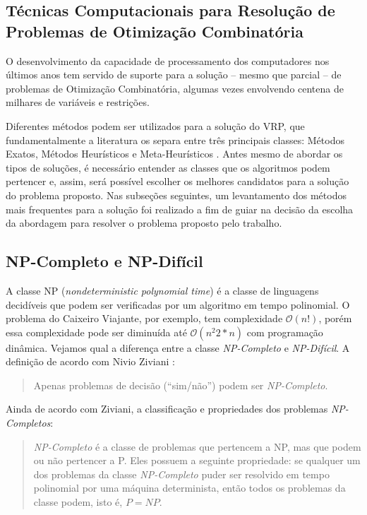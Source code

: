 \subsection{Técnicas Computacionais para Resolução de Problemas de Otimização Combinatória}
\label{tecnicas-computacionais}
O desenvolvimento da capacidade de processamento dos computadores nos últimos anos tem servido de suporte para a solução -- mesmo que parcial -- de problemas de Otimização Combinatória, algumas vezes envolvendo centena de milhares de variáveis e restrições.

Diferentes métodos podem ser utilizados para a solução do VRP, que fundamentalmente a literatura os separa entre três principais classes: Métodos Exatos, Métodos Heurísticos e Meta-Heurísticos \cite{maxwell}. Antes mesmo de abordar os tipos de soluções, é necessário entender as classes que os algoritmos podem pertencer e, assim, será possível escolher os melhores candidatos para a solução do problema proposto. Nas subseções seguintes, um levantamento dos métodos mais frequentes para a solução foi realizado a fim de guiar na decisão da escolha da abordagem para resolver o problema proposto pelo trabalho.

\subsection{NP-Completo e NP-Difícil}
\label{classes-np}
A classe NP (\emph{nondeterministic polynomial time}) é a classe de linguagens decidíveis que podem ser verificadas por um algoritmo em tempo polinomial. O problema do Caixeiro Viajante, por exemplo, tem complexidade $\mathcal{O}(n!)$, porém essa complexidade pode ser diminuída até $\mathcal{O}(n^2 2*n)$ com programação dinâmica. Vejamos qual a diferença entre a classe \emph{NP-Completo} e \emph{NP-Difícil}. A definição de acordo com Nivio Ziviani \cite{ziviani}:

\begin{quote}
Apenas problemas de decisão (“sim/não”) podem ser \emph{NP-Completo}.
\end{quote}

Ainda de acordo com Ziviani, a classificação e propriedades dos problemas \emph{NP-Completos}: 

\begin{quote}
\emph{NP-Completo} é a classe de problemas que pertencem a NP, mas que podem ou não pertencer a P. Eles possuem a seguinte propriedade: se qualquer um dos problemas da classe \emph{NP-Completo} puder ser resolvido em tempo polinomial por uma máquina determinista, então todos os problemas da classe podem, isto é, $P = NP$.
\end{quote}

